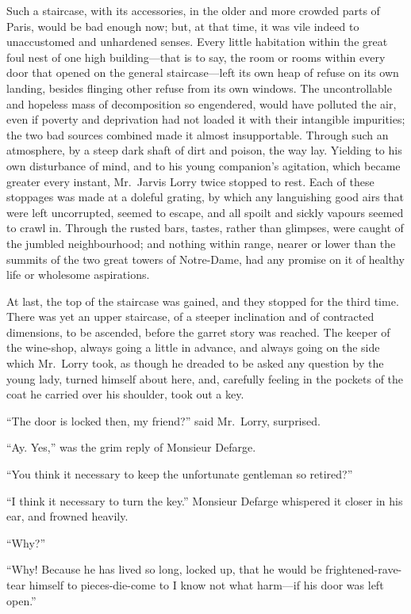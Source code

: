 Such a staircase, with its accessories, in the older and more crowded
parts of Paris, would be bad enough now; but, at that time, it was
vile indeed to unaccustomed and unhardened senses.  Every little
habitation within the great foul nest of one high building---that is
to say, the room or rooms within every door that opened on the
general staircase---left its own heap of refuse on its own landing,
besides flinging other refuse from its own windows.  The uncontrollable
and hopeless mass of decomposition so engendered, would have polluted
the air, even if poverty and deprivation had not loaded it with their
intangible impurities; the two bad sources combined made it almost
insupportable.  Through such an atmosphere, by a steep dark shaft of
dirt and poison, the way lay.  Yielding to his own disturbance of
mind, and to his young companion's agitation, which became greater
every instant, Mr.\ Jarvis Lorry twice stopped to rest.  Each of these
stoppages was made at a doleful grating, by which any languishing
good airs that were left uncorrupted, seemed to escape, and all
spoilt and sickly vapours seemed to crawl in.  Through the rusted
bars, tastes, rather than glimpses, were caught of the jumbled
neighbourhood; and nothing within range, nearer or lower than the
summits of the two great towers of Notre-Dame, had any promise on it
of healthy life or wholesome aspirations.

At last, the top of the staircase was gained, and they stopped for
the third time.  There was yet an upper staircase, of a steeper
inclination and of contracted dimensions, to be ascended, before the
garret story was reached.  The keeper of the wine-shop, always going
a little in advance, and always going on the side which Mr.\ Lorry
took, as though he dreaded to be asked any question by the young
lady, turned himself about here, and, carefully feeling in the
pockets of the coat he carried over his shoulder, took out a key.

``The door is locked then, my friend?'' said Mr.\ Lorry, surprised.

``Ay.  Yes,'' was the grim reply of Monsieur Defarge.

``You think it necessary to keep the unfortunate gentleman so retired?''

``I think it necessary to turn the key.''  Monsieur Defarge whispered it
closer in his ear, and frowned heavily.

``Why?''

``Why!  Because he has lived so long, locked up, that he would be
frightened-rave-tear himself to pieces-die-come to I know not what
harm---if his door was left open.''

